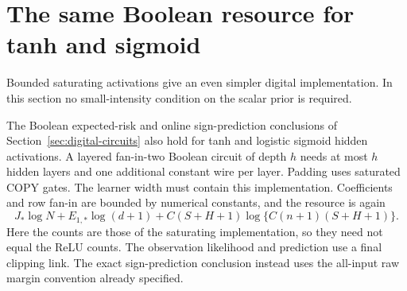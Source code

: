 \section{The same Boolean resource for tanh and sigmoid}
\label{sec:saturating-Boolean}
Bounded saturating activations give an even simpler digital implementation. In this section no small-intensity condition on the scalar prior is required.

\begin{proposition}
\label{prop:saturating-Boolean}
The Boolean expected-risk and online sign-prediction conclusions of Section~\ref{sec:digital-circuits} also hold for tanh and logistic sigmoid hidden activations. A layered fan-in-two Boolean circuit of depth $h$ needs at most $h$ hidden layers and one additional constant wire per layer. Padding uses saturated COPY gates. The learner width must contain this implementation. Coefficients and row fan-in are bounded by numerical constants, and the resource is again
\[
 J_*\log N+E_{1,*}\log(d+1)
       +C(S+H+1)\log\{C(n+1)(S+H+1)\}.
\]
Here the counts are those of the saturating implementation, so they need not equal the ReLU counts. The observation likelihood and prediction use a final clipping link. The exact sign-prediction conclusion instead uses the all-input raw margin convention already specified.
\end{proposition}
